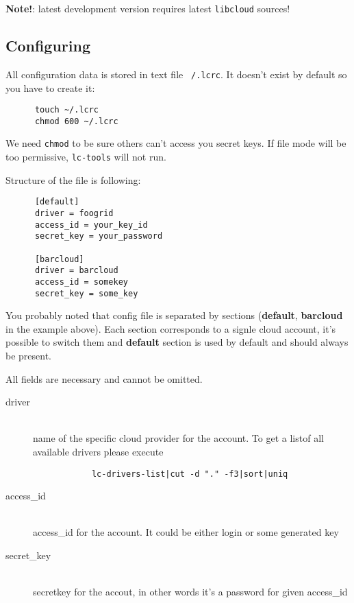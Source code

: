 \documentclass[a4paper]{report}
\begin{document}
          \textbf{Note!}: latest development version requires latest {\tt libcloud}
          sources!
      \subsection{Configuring} \label{conf}
      All configuration data is stored in text file {\tt ~/.lcrc}. It doesn't exist
      by default so you have to create it:

      \begin{verbatim}
      touch ~/.lcrc
      chmod 600 ~/.lcrc
      \end{verbatim}

      We need {\tt chmod} to be sure others can't access you secret keys. If file mode
      will be too permissive, {\tt lc-tools} will not run.

      Structure of the file is following:

      \begin{verbatim}
      [default]
      driver = foogrid
      access_id = your_key_id
      secret_key = your_password

      [barcloud]
      driver = barcloud
      access_id = somekey
      secret_key = some_key
      \end{verbatim}

      You probably noted that config file is separated by sections (\textbf{default},
      \textbf{barcloud} in the example above). Each section corresponds to a signle
      cloud account, it's possible to switch them and \textbf{default} section is
      used by default and should always be present.

      All fields are necessary and cannot be omitted.

      \begin{description}
        \item[driver] \hfill \\
          name of the specific cloud provider for the account. To get a listof all
          available drivers please execute

          \begin{verbatim}
            lc-drivers-list|cut -d "." -f3|sort|uniq
          \end{verbatim}

        \item[access\_id] \hfill \\
          access\_id for the account. It could be either login or some generated key
        \item[secret\_key] \hfill \\
          secretkey for the accout, in other words it's a password for given access\_id
      \end{description}
\end{document}
